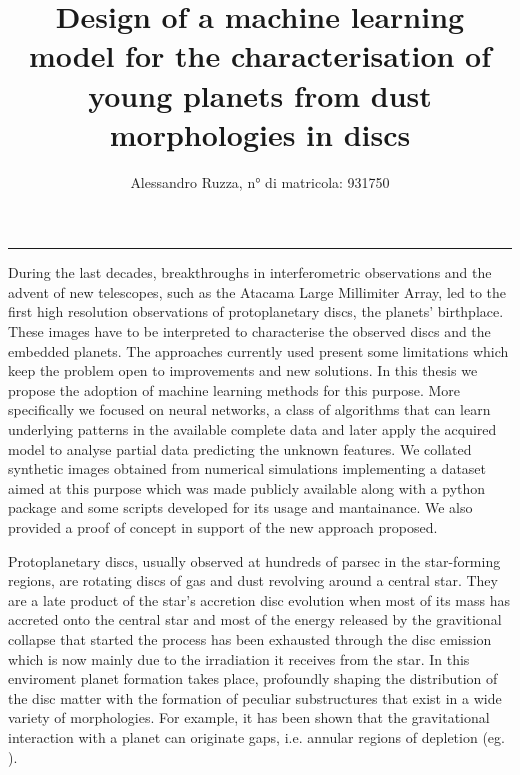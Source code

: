 \documentclass[a4paper,10pt, margin=1cm]{article}
\title{\fontsize{17}{17}\textbf{Design of a machine learning model for the characterisation of young planets from dust morphologies in discs}}
\author{Alessandro Ruzza, n° di matricola: 931750\vspace{-5em}}
\date{}
\begin{document}
\maketitle
\noindent\rule[0.5ex]{10cm}{1pt}

\vspace{2em}
During the last decades, breakthroughs in interferometric observations 
and the advent of new telescopes, such as the Atacama Large Millimiter Array,  
led to the first high resolution observations of protoplanetary discs,
the planets' birthplace. These images have to be interpreted to characterise the observed discs and the
embedded planets.
The approaches currently used present some limitations which keep the problem open to improvements and new solutions.
In this thesis we propose the adoption of machine learning methods 
for this purpose.
More specifically we focused on neural networks, a class of algorithms that can learn underlying patterns in the available complete data
and later apply the acquired model to analyse partial data predicting the unknown features.
We collated synthetic images obtained from numerical simulations implementing a dataset aimed at this purpose which
was made publicly available along with a python package and some scripts developed for its usage and mantainance.
We also provided a proof of concept in support of the new approach proposed.

Protoplanetary discs, usually observed at hundreds of parsec in the star-forming regions, 
are rotating discs of gas and dust revolving around a central star.
They are a late product of the star's accretion disc evolution when most of its mass has accreted onto
the central star and most of the energy released by the gravitional collapse that started the process has been exhausted through 
the disc emission which is now mainly due to the irradiation it receives from the star.
In this enviroment planet formation takes place, profoundly shaping the distribution of the disc matter with the formation
of peculiar substructures that exist in a wide variety of morphologies.
For example, it has been shown that the gravitational interaction with a planet can originate gaps, i.e.
annular regions of depletion (eg. \citealt{gap_opening2,gap_opening3}).

\begin{comment}
To observe these discs three categories of emitted radiation are usually probed: the light scattered by micron-sized dust grains,
the molecular emission of CO or HD in the gas component and the dust thermal continuum emission in the millimetric 
which is the tracer probed in the simulations used in this thesis. 
Among the various tracers probed to obtain images 
\end{comment}
\end{document}
